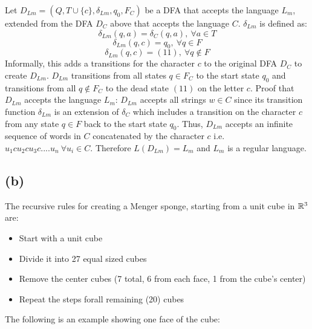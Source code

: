 \documentclass[12pt]{article}
\begin{document}
Let $D_{Lm} = (Q, T \cup \{c\}, \delta_{Lm}, q_0, F_C)$ be a DFA that accepts
the language $L_m$, extended from the DFA $D_C$ above that accepts the
language $C$. $\delta_{Lm}$ is defined as:
$$\delta_{Lm}(q, a) = \delta_C (q, a) ,\: \forall a \in T$$
$$\delta_{Lm}(q, c) = q_0 ,\: \forall q \in F$$
$$\delta_{Lm}(q, c) = (11) ,\: \forall q \notin F$$
Informally, this adds a transitions for the character $c$ to the original DFA
$D_C$ to create $D_{Lm}$. $D_{Lm}$ transitions from all states $q \in F_C$ to
the start state $q_0$ and transitions from all $q \notin F_C$ to the dead state
$(11)$ on the letter $c$.
\newline
\newline
Proof that $D_{Lm}$ accepts the language $L_m$:
\newline
\indent $D_{Lm}$ accepts all strings $w \in C$ since its transition function
$\delta_{Lm}$ is an extension of $\delta_C$ which includes a transition on the
character $c$ from any state $q \in F$ back to the start state $q_0$. Thus,
$D_{Lm}$ accepts an infinite sequence of words in $C$ concatenated by the
character $c$ i.e. $u_1cu_2cu_3c....u_n \: \forall u_i \in C$.
Therefore $L(D_{Lm}) = L_m$ and $L_m$ is a regular language.
\subsection*{(b)} The recursive rules for creating a Menger sponge, starting
from a unit cube in $\mathbb{R}^3$ are:
\begin{itemize}
\item Start with a unit cube
\item Divide it into 27 equal sized cubes
\item Remove the center cubes
(7 total, 6 from each face, 1 from the cube's center)
\item Repeat the steps forall remaining (20) cubes
\end{itemize}
The following is an example showing one face of the cube:
\newline
{}
\medskip
{}
\medskip
{}
\newpage
\end{document}
